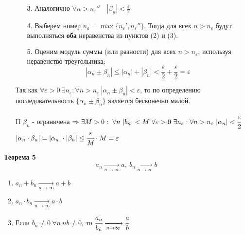 \documentclass[12pt, a4paper]{article}
\newcommand{\eps}{\varepsilon}
\begin{document}
\begin{centering}
\begin{tcolorbox}[title=Доказательство Т4: Предел суммы/разности б.м. последовательностей, breakable]
\begin{enumerate}
\begin{enumerate}
    \item[3.] Аналогично $\forall n > n_{\varepsilon}''\quad |\beta_n| < \frac{\varepsilon}{2}$
    
    \item[4.] Выберем номер \( n_\varepsilon = \max\{n_{\varepsilon}', n_{\varepsilon}''\} \). Тогда для всех \( n > n_\varepsilon \) будут выполняться \textbf{оба} неравенства из пунктов (2) и (3).
    \item[5.] Оценим модуль суммы (или разности) для всех \( n > n_\varepsilon \), используя неравенство треугольника:
    \[
    |\alpha_n \pm \beta_n| \leq |\alpha_n| + |\beta_n| < \frac{\varepsilon}{2} + \frac{\varepsilon}{2} = \varepsilon
    \]
\end{enumerate}

Так как \( \forall \varepsilon > 0\ \exists n_\varepsilon: \forall n > n_\eps\ |\alpha_n \pm \beta_n| < \varepsilon \), то по определению последовательность \( \{\alpha_n \pm \beta_n\} \) является бесконечно малой.

\item[II] {$\beta_n$} - ограничена $\Rightarrow \exists M > 0:\ \forall n \ |b_n| < M \ \forall\eps > 0\ \exists n_\eps : \forall n > n_\eps\ |\alpha_n| < \cfrac{\eps}{2}$\\
$|\alpha_n \cdot \beta_n|= |\alpha_n| \cdot |\beta_n| \leq \cfrac{\eps}{M} \cdot M = \eps$
\end{enumerate}
\end{tcolorbox}

\begin{tcolorbox}
\textbf{Теорема 5}
\[ a_n \xrightarrow[n\rightarrow \infty]{}a,\ b_n \xrightarrow[n\rightarrow \infty]{}b\]
\begin{enumerate}
    \item $a_n + b_n \xrightarrow[n\rightarrow \infty]{} a + b$
    \item $a_n \cdot b_n \xrightarrow[n\rightarrow \infty]{} a \cdot b$
    \item Если $b_n \ne 0\ \forall n \ nb \ne 0$, то $\cfrac{a_n}{b_n} \xrightarrow[n\rightarrow \infty]{} \cfrac{a}{b}$
\end{enumerate}
\end{tcolorbox}


\end{centering}
\end{document}
